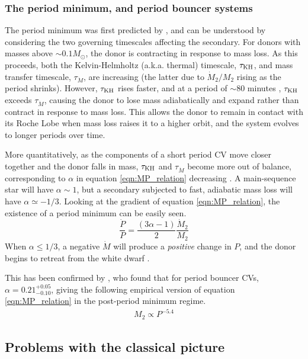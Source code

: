 \subsubsection{The period minimum, and period bouncer systems}
\label{sect:introduction:period minimum and bouncers}

The period minimum was first predicted by \citet{rappaport1982}, and can be understood by considering the two governing timescales affecting the secondary. 
For donors with masses above $\sim0.1 M_{\odot}$, the donor is contracting in response to mass loss. 
As this proceeds, both the Kelvin-Helmholtz (a.k.a. thermal) timescale, $\tau_{\rm KH}$, and mass transfer timescale, $\tau_{\dot M}$, are increasing (the latter due to $\dot M_2 / M_2$ rising as the period shrinks). However, $\tau_{\rm KH}$ rises faster, and at a period of $\sim80$ minutes \citep{ritter1998, McAllister2019}, $\tau_{\rm KH}$ exceeds $\tau_{\dot M}$, causing the donor to lose mass adiabatically and expand rather than contract in response to mass loss.
This allows the donor to remain in contact with its Roche Lobe when mass loss raises it to a higher orbit, and the system evolves to longer periods over time.

More quantitatively, as the components of a short period CV move closer together and the donor falls in mass, $\tau_{\rm KH}$ and $\tau_{\dot M}$ become more out of balance, corresponding to $\alpha$ in equation \ref{eqn:MP_relation} decreasing \citep{Knigge2011b}. A main-sequence star will have $\alpha \sim 1$, but a secondary subjected to fast, adiabatic mass loss will have $\alpha \simeq -1/3$. Looking at the gradient of equation \ref{eqn:MP_relation}, the existence of a period minimum can be easily seen.
\begin{equation}
    \frac{\dot P}{P} = \frac{(3\alpha - 1)}{2} \frac{\dot M_2}{M_2}
\end{equation}
When $\alpha \le 1/3$, a negative $\dot M$ will produce a \textit{positive} change in $P$, and the donor begins to retreat from the white dwarf \citep{rezzolla2001}. 

This has been confirmed by \citet{knigge11}, who found that for period bouncer CVs, $\alpha = 0.21^{+0.05}_{-0.10}$, giving the following empirical version of equation \ref{eqn:MP_relation} in the post-period minimum regime.
\begin{align}
    M_2 \propto P^{-5.4}
\end{align}


\subsection{Problems with the classical picture}
\label{sect:introduction:modern AML}

